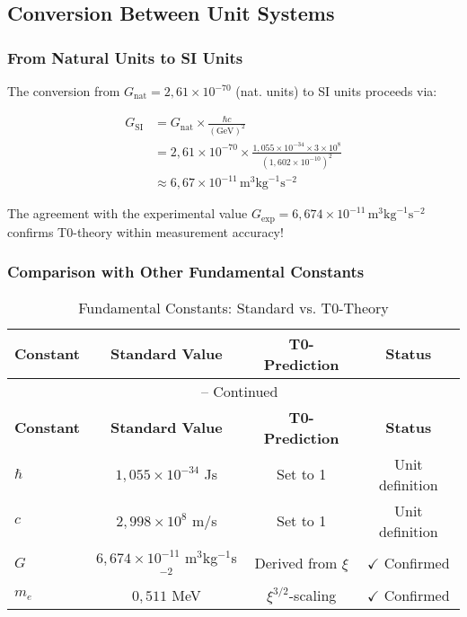 \documentclass[12pt,a4paper]{article}
\theoremstyle{definition}
\begin{document}
\subsection{Conversion Between Unit Systems}

\subsubsection{From Natural Units to SI Units}

The conversion from $G_{\text{nat}} = 2{,}61 \times 10^{-70}$ (nat. units) to SI units proceeds via:

\begin{align}
	G_{\text{SI}} &= G_{\text{nat}} \times \frac{\hbar c}{(\text{GeV})^2} \\
	&= 2{,}61 \times 10^{-70} \times \frac{1{,}055 \times 10^{-34} \times 3 \times 10^8}{(1{,}602 \times 10^{-10})^2} \\
	&\approx 6{,}67 \times 10^{-11} \, \text{m}^3 \text{kg}^{-1} \text{s}^{-2}
\end{align}

\begin{important}
	The agreement with the experimental value $G_{\text{exp}} = 6{,}674 \times 10^{-11} \, \text{m}^3 \text{kg}^{-1} \text{s}^{-2}$ confirms T0-theory within measurement accuracy!
\end{important}

\subsubsection{Comparison with Other Fundamental Constants}

\begin{longtable}{lccc}
	\caption{Fundamental Constants: Standard vs. T0-Theory} \\
	\toprule
	\textbf{Constant} & \textbf{Standard Value} & \textbf{T0-Prediction} & \textbf{Status} \\
	\midrule
	\endfirsthead
	\multicolumn{4}{c}{\tablename\ \thetable{} -- Continued} \\
	\toprule
	\textbf{Constant} & \textbf{Standard Value} & \textbf{T0-Prediction} & \textbf{Status} \\
	\midrule
	\endhead
	$\hbar$ & $1{,}055 \times 10^{-34}$ Js & Set to 1 & Unit definition \\
	$c$ & $2{,}998 \times 10^8$ m/s & Set to 1 & Unit definition \\
	$G$ & $6{,}674 \times 10^{-11}$ m$^3$kg$^{-1}$s$^{-2}$ & Derived from $\xi$ & $\checkmark$ Confirmed \\
	$m_e$ & $0{,}511$ MeV & $\xi^{3/2}$-scaling & $\checkmark$ Confirmed \\
	\bottomrule
\end{longtable}
\end{document}
